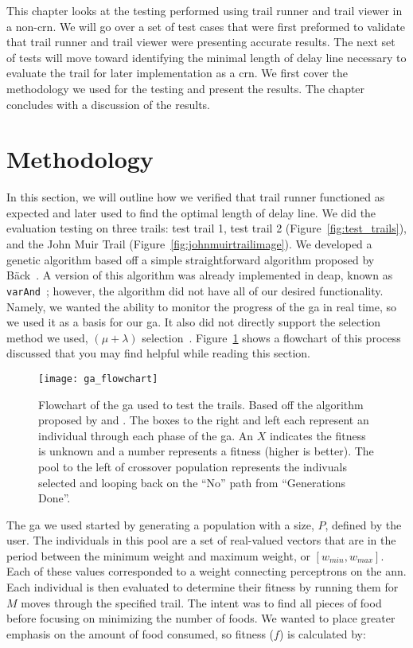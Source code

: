 This chapter looks at the testing performed using trail runner and trail viewer in a non-\gls{crn}. We will go over a set of test cases that were first preformed to validate that trail runner and trail viewer were presenting accurate results. The next set of tests will move toward identifying the minimal length of delay line necessary to evaluate the trail for later implementation as a \gls{crn}. We first cover the methodology we used for the testing and present the results. The chapter concludes with a discussion of the results.

\section{Methodology}
\label{sec:trail_runner_methods}
In this section, we will outline how we verified that trail runner functioned as expected and later used to find the optimal length of delay line. We did the evaluation testing on three trails: test trail 1, test trail 2 (Figure~\ref{fig:test_trails}), and the John Muir Trail (Figure~\ref{fig:johnmuirtrailimage}). We developed a genetic algorithm based off a simple straightforward algorithm proposed by B\"{a}ck~\cite{Baeck2000-co}. A version of this algorithm was already implemented in \gls{deap}, known as \texttt{varAnd}~\cite{Fortin2012-yv}; however, the algorithm did not have all of our desired functionality. Namely, we wanted the ability to monitor the progress of the \gls{ga} in real time, so we used it as a basis for our \gls{ga}. It also did not directly support the selection method we used, $(\mu + \lambda)$ selection~\cite{Schwefel1976-er}. Figure~\ref{fig:ga_flowchart} shows a flowchart of this process discussed that you may find helpful while reading this section.

\begin{figure}[p]
\centering
\texttt{[image: ga\_flowchart]}
\caption[Genetic Algorithm Flow Chart]{Flowchart of the \gls{ga} used to test the trails. Based off the algorithm proposed by \cite{Baeck2000-co} and \cite{Fortin2012-yv}. The boxes to the right and left each represent an individual through each phase of the \gls{ga}. An $X$ indicates the fitness is unknown and a number represents a fitness (higher is better). The pool to the left of crossover population represents the indivuals selected and looping back on the ``No'' path from ``Generations Done''.}
\label{fig:ga_flowchart}
\end{figure}

The \gls{ga} we used started by generating a population with a size, $P$, defined by the user. The individuals in this pool are a set of real-valued vectors that are in the period between the minimum weight and maximum weight, or $[w_{min}, w_{max}]$. Each of these values corresponded to a weight connecting perceptrons on the \gls{ann}. Each individual is then evaluated to determine their fitness by running them for $M$ moves through the specified trail. The intent was to find all pieces of food before focusing on minimizing the number of foods. We wanted to place greater emphasis on the amount of food consumed, so fitness ($f$) is calculated by:

